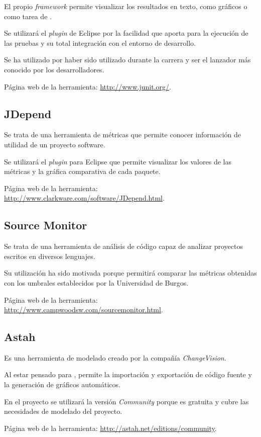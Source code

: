 El propio \textit{framework} permite visualizar los resultados en texto, como gráficos o como tarea de \ant{}.

Se utilizará el \textit{plugin} de Eclipse por la facilidad que aporta para la ejecución de las pruebas y su total integración con el entorno de desarrollo.

Se ha utilizado por haber sido utilizado durante la carrera y ser el lanzador más conocido por los desarrolladores.

Página web de la herramienta: \url{http://www.junit.org/}.


\subsection{JDepend}
Se trata de una herramienta de métricas que permite conocer información de utilidad de un proyecto software.

Se utilizará el \textit{plugin} para Eclipse que permite visualizar los valores de las métricas y la gráfica comparativa de cada paquete.

Página web de la herramienta: \url{http://www.clarkware.com/software/JDepend.html}.


\subsection{Source Monitor}
Se trata de una herramienta de análisis de código capaz de analizar proyectos escritos en diversos lenguajes.

Su utilización ha sido motivada porque permitirá comparar las métricas obtenidas con los umbrales establecidos por la Universidad de Burgos.

Página web de la herramienta: \url{http://www.campwoodsw.com/sourcemonitor.html}.


\subsection{Astah}
Es una herramienta de modelado \uml{} creado por la compañía \textit{ChangeVision}.

Al estar pensado para \java{}, permite la importación y exportación de código fuente y la generación de gráficos automáticos.

En el proyecto se utilizará la versión \textit{Community} porque es gratuita y cubre las necesidades de modelado del proyecto.

Página web de la herramienta: \url{http://astah.net/editions/community}.


